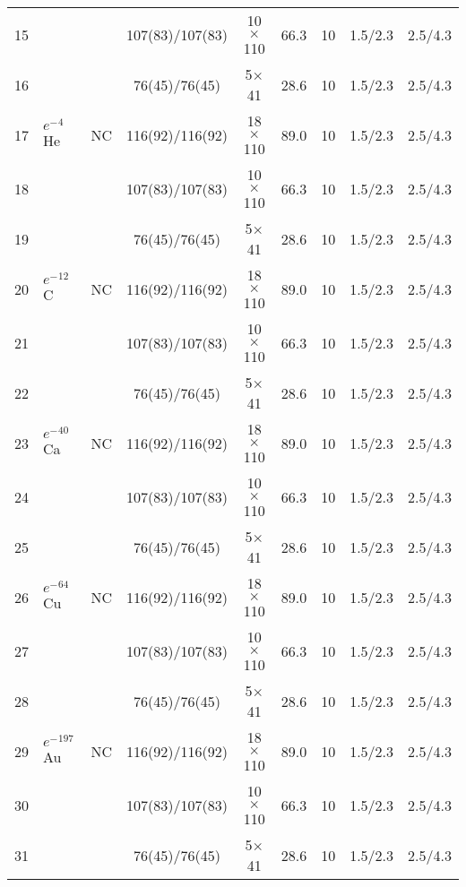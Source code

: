 \begin{tabularx}{\linewidth}{XXXccrrcc}
      15
    &
    &
    & 107(83)/107(83)
    & 10$\times$110
    & 66.3
    & 10
    & 1.5/2.3
    & 2.5/4.3 \\
      16 
    &
    &
    & 76(45)/76(45)
    & 5$\times$41
    & 28.6
    & 10
    & 1.5/2.3
    & 2.5/4.3 \\
    \midrule
      17  
    & $e^-{^4}$He
    & NC
    & 116(92)/116(92)
    & 18$\times$110
    & 89.0
    & 10
    & 1.5/2.3
    & 2.5/4.3 \\
      18  
    &
    &
    & 107(83)/107(83)
    & 10$\times$110
    & 66.3
    & 10
    & 1.5/2.3
    & 2.5/4.3 \\
      19  
    &
    &
    & 76(45)/76(45)
    & 5$\times$41
    & 28.6
    & 10
    & 1.5/2.3
    & 2.5/4.3 \\
      20  
    & $e^-{^{12}}$C
    & NC
    & 116(92)/116(92)
    & 18$\times$110
    & 89.0
    & 10
    & 1.5/2.3
    & 2.5/4.3 \\
      21  
    &
    &
    & 107(83)/107(83)
    & 10$\times$110
    & 66.3
    & 10
    & 1.5/2.3
    & 2.5/4.3 \\
      22  
    &
    &
    & 76(45)/76(45)
    & 5$\times$41
    & 28.6
    & 10
    & 1.5/2.3
    & 2.5/4.3 \\
      23  
    & $e^-{^{40}}$Ca
    & NC
    & 116(92)/116(92)
    & 18$\times$110
    & 89.0
    & 10
    & 1.5/2.3
    & 2.5/4.3 \\
      24  
    &
    &
    & 107(83)/107(83)
    & 10$\times$110
    & 66.3
    & 10
    & 1.5/2.3
    & 2.5/4.3 \\
      25  
    &
    &
    & 76(45)/76(45)
    & 5$\times$41
    & 28.6
    & 10
    & 1.5/2.3
    & 2.5/4.3 \\
      26  
    & $e^-{^{64}}$Cu
    & NC
    & 116(92)/116(92)
    & 18$\times$110
    & 89.0
    & 10
    & 1.5/2.3
    & 2.5/4.3 \\
      27  
    &
    &
    & 107(83)/107(83)
    & 10$\times$110
    & 66.3
    & 10
    & 1.5/2.3
    & 2.5/4.3 \\
      28  
    &
    &
    & 76(45)/76(45)
    & 5$\times$41
    & 28.6
    & 10
    & 1.5/2.3
    & 2.5/4.3 \\
      29  
    & $e^-{^{197}}$Au
    & NC
    & 116(92)/116(92)
    & 18$\times$110
    & 89.0
    & 10
    & 1.5/2.3
    & 2.5/4.3 \\
      30  
    &
    &
    & 107(83)/107(83)
    & 10$\times$110
    & 66.3
    & 10
    & 1.5/2.3
    & 2.5/4.3 \\
      31  
    &
    &
    & 76(45)/76(45)
    & 5$\times$41
    & 28.6
    & 10
    & 1.5/2.3
    & 2.5/4.3 \\    
    \bottomrule
  \end{tabularx}
